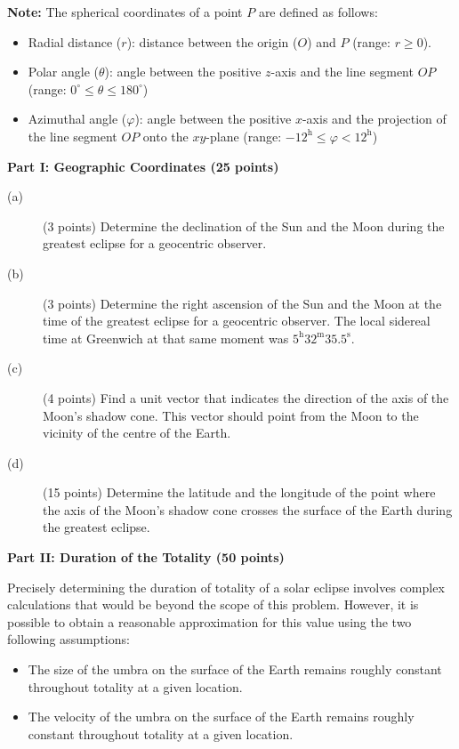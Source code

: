 \textbf{Note:} The spherical coordinates of a point $P$ are defined as
follows:
\begin{itemize}
\item Radial distance ($r$): distance between the origin ($O$) and $P$
  (range: $r \geq 0$).
\item Polar angle ($\theta$): angle between the positive $z$-axis and the
  line segment $OP$ (range: $0^\circ \leq \theta \leq 180^\circ$)
\item Azimuthal angle ($\varphi$): angle between the positive $x$-axis and
  the projection of the line segment $OP$ onto the $xy$-plane (range:
  $-12^{\mathrm{h}} \leq \varphi < 12^{\mathrm{h}}$)
\end{itemize}


\textbf{Part I: Geographic Coordinates (25 points)}

\begin{description}
\item[(a)] (3 points) Determine the declination of the Sun and the Moon
  during the greatest eclipse for a geocentric observer.
\item[(b)] (3 points) Determine the right ascension of the Sun and the Moon
  at the time of the greatest eclipse for a geocentric observer. The local
  sidereal time at Greenwich at that same moment was
  $5^{\mathrm{h}}32^{\mathrm{m}}35.5^{\mathrm{s}}$.
\item[(c)] (4 points) Find a unit vector that indicates the direction of the
  axis of the Moon's shadow cone. This vector should point from the Moon to
  the vicinity of the centre of the Earth.
\item[(d)] (15 points) Determine the latitude and the longitude of the point
  where the axis of the Moon's shadow cone crosses the surface of the Earth
  during the greatest eclipse.
\end{description}

\textbf{Part II: Duration of the Totality (50 points)}

Precisely determining the duration of totality of a solar eclipse involves
complex calculations that would be beyond the scope of this problem. However,
it is possible to obtain a reasonable approximation for this value using the
two following assumptions:
\begin{itemize}
\item The size of the umbra on the surface of the Earth remains roughly
  constant throughout totality at a given location.
\item The velocity of the umbra on the surface of the Earth remains roughly
  constant throughout totality at a given location.
\end{itemize}


